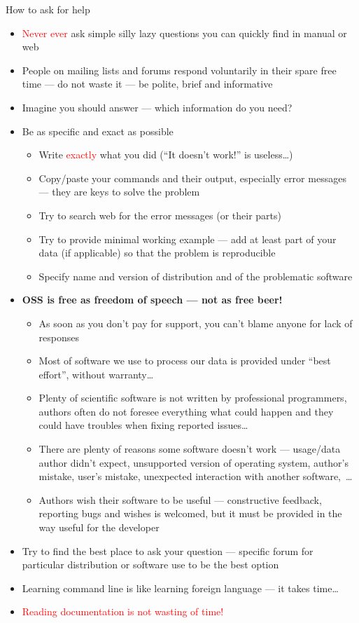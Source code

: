 \documentclass[compress, xelatex, 11pt, xcolor=svgnames, aspectratio=169,
	hyperref={
		bookmarks=true,
		unicode=true,
		colorlinks=true,
		pdftitle={Linux, command line and MetaCentrum},
		plainpages=false,
		pdfauthor={Vojtech Zeisek},
		pdfsubject={Course about use of Linux command line, writing shell scripts and using MetaCentrum of CESNET},
		pdfcreator={XeLaTeX},
		pdfkeywords={Linux, GNU, BASH, shell, command line, MetaCentrum},
		linkcolor=DarkRed, %
		anchorcolor=DarkBlue, %
		citecolor=Indigo, %
		filecolor=NavyBlue, %
		menucolor=DarkMagenta, %
		urlcolor=DarkBlue, %
		},
	url={hyphens, lowtilde} %
	]{beamer}
\renewcommand{\alert}[1]{\textcolor{red}{#1}}
\begin{document}
\begin{frame}[allowframebreaks]{How to ask for help}
	\label{howtoask}
	\begin{itemize}
		\item \alert{Never ever} ask simple silly lazy questions you can quickly find in manual or web
		\item People on mailing lists and forums respond voluntarily in their spare free time --- do not waste it --- be polite, brief and informative
		\item Imagine you should answer --- which information do you need?
		\item Be as specific and exact as possible
		\begin{itemize}
			\item Write \alert{exactly} what you did (\enquote{It doesn't work!} is useless\ldots)
			\item Copy/paste your commands and their output, especially error messages --- they are keys to solve the problem
			\item Try to search web for the error messages (or their parts)
			\item Try to provide minimal working example --- add at least part of your data (if applicable) so that the problem is reproducible
			\item Specify name and version of distribution and of the problematic software
		\end{itemize}
		\item \textbf{OSS is free as freedom of speech --- not as free beer!}
		\begin{itemize}
			\item As soon as you don't pay for support, you can't blame anyone for lack of responses
			\item Most of software we use to process our data is provided under \enquote{best effort}, without warranty\ldots
			\item Plenty of scientific software is not written by professional programmers, authors often do not foresee everything what could happen and they could have troubles when fixing reported issues\ldots
			\item There are plenty of reasons some software doesn't work --- usage/data author didn't expect, unsupported version of operating system, author's mistake, user's mistake, unexpected interaction with another software,~\ldots
			\item Authors wish their software to be useful --- constructive feedback, reporting bugs and wishes is welcomed, but it must be provided in the way useful for the developer
		\end{itemize}
		\item Try to find the best place to ask your question --- specific forum for particular distribution or software use to be the best option
		\item Learning command line is like learning foreign language --- it takes time\ldots
		\item \alert{Reading documentation is not wasting of time!}
	\end{itemize}
\end{frame}
\end{document}
